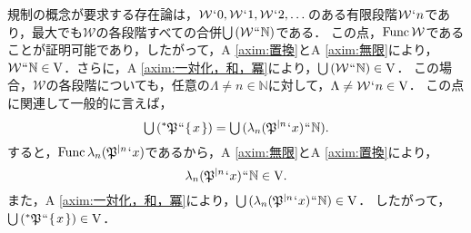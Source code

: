 \noindent 規制の概念が要求する存在論は，$ \mathcal{W}\fap 0,\mathcal{W}\fap 1,\mathcal{W}\fap 2,\dots $のある有限段階$ \mathcal{W}\fap n $であり，最大でも$\mathcal{W}$の各段階すべての合併$ \union{(\mathcal{W}\img\mathbb{N})} $である．
この点，$\func{\mathcal{W}}$であることが証明可能であり，したがって，A \ref{axim:置換}とA \ref{axim:無限}により，$ \mathcal{W}\img\mathbb{N}\in\univ $．さらに，A \ref{axim:一対化，和，冪}により，$\union{(\mathcal{W}\img\mathbb{N})}\in\univ$．
この場合，$\mathcal{W}$の各段階についても，任意の$\Lambda\neq n\in\mathbb{N}$に対して，$ \Lambda\neq \mathcal{W}\fap n\in\univ $．
この点に関連して一般的に言えば，
\[
    \union{(\ance{\mathfrak{P}}\img\classab{x})}= \union{(\lambda_n(\iter{\mathfrak{P}}{n}\fap x)\img\mathbb{N})}.
\]
すると，$ \func{\lambda_n(\iter{\mathfrak{P}}{n}\fap x)} $であるから，A \ref{axim:無限}とA \ref{axim:置換}により，
\[
    \lambda_n(\iter{\mathfrak{P}}{n}\fap x)\img\mathbb{N}\in\univ.
\]
また，A \ref{axim:一対化，和，冪}により，$ \union{(\lambda_n(\iter{\mathfrak{P}}{n}\fap x)\img\mathbb{N})}\in\univ $．
したがって，$ \union{(\ance{\mathfrak{P}}\img\classab{x})}\in\univ $．

